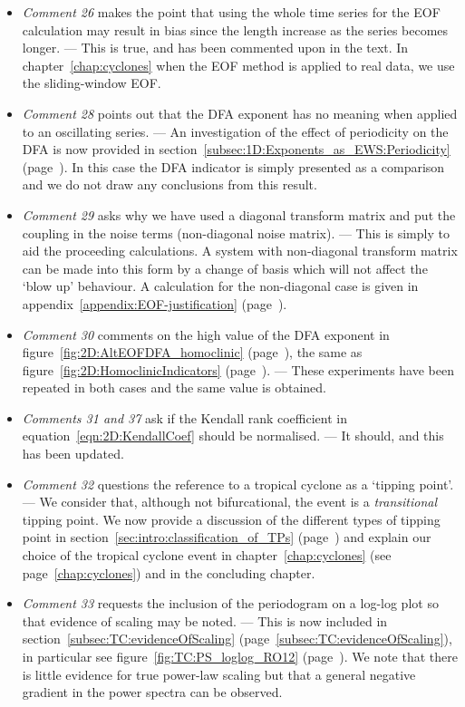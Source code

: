\begin{itemize}
	\item \emph{Comment 26} makes the point that using the whole time series for the EOF calculation may result in bias since the length increase as the series becomes longer. — This is true, and has been commented upon in the text. In chapter~\ref{chap:cyclones} when the EOF method is applied to real data, we use the sliding-window EOF.
	\item \emph{Comment 28} points out that the DFA exponent has no meaning when applied to an oscillating series. — An investigation of the effect of periodicity on the DFA is now provided in section~\ref{subsec:1D:Exponents_as_EWS:Periodicity} (page~\pageref{subsec:1D:Exponents_as_EWS:Periodicity}). In this case the DFA indicator is simply presented as a comparison and we do not draw any conclusions from this result. 
	\item \emph{Comment 29} asks why we have used a diagonal transform matrix and put the coupling in the noise terms (non-diagonal noise matrix). — This is simply to aid the proceeding calculations. A system with non-diagonal transform matrix can be made into this form by a change of basis which will not affect the `blow up' behaviour. A calculation for the non-diagonal case is given in appendix~\ref{appendix:EOF-justification} (page~\pageref{appendix:EOF-justification}).
	\item \emph{Comment 30} comments on the high value of the DFA exponent in figure~\ref{fig:2D:AltEOFDFA_homoclinic} (page~\pageref{fig:2D:AltEOFDFA_homoclinic}), the same as figure~\ref{fig:2D:HomoclinicIndicators} (page~\pageref{fig:2D:HomoclinicIndicators}). — These experiments have been repeated in both cases and the same value is obtained. 
	\item \emph{Comments 31 and 37} ask if the Kendall rank coefficient in equation~\ref{eqn:2D:KendallCoef} should be normalised. — It should, and this has been updated.
	\item \emph{Comment 32} questions the reference to a tropical cyclone as a `tipping point'. — We consider that, although not bifurcational, the event is a \emph{transitional} tipping point. We now provide a discussion of the different types of tipping point in section~\ref{sec:intro:classification_of_TPs} (page~\pageref{sec:intro:classification_of_TPs}) and explain our choice of the tropical cyclone event in chapter~\ref{chap:cyclones} (see page~\ref{chap:cyclones}) and in the concluding chapter.
	\item \emph{Comment 33} requests the inclusion of the periodogram on a log-log plot so that evidence of scaling may be noted. — This is now included in section~\ref{subsec:TC:evidenceOfScaling} (page~\ref{subsec:TC:evidenceOfScaling}), in particular see figure~\ref{fig:TC:PS_loglog_RO12} (page~\pageref{fig:TC:PS_loglog_RO12}). We note that there is little evidence for true power-law scaling but that a general negative gradient in the power spectra can be observed.

\end{itemize}

